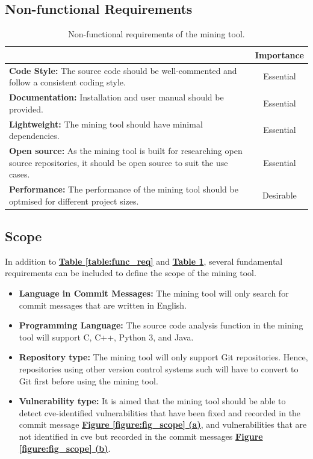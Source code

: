 \documentclass[12pt, a4paper]{report}
\begin{document}
\subsection{Non-functional Requirements}
\begin{table}[H]
  \centering
  \begin{tabular}{|p{10.3cm}|c|}
    \hline \rowcolor[HTML]{D8D8D8}
    \multicolumn{1}{|c|}{Criteria} & Importance \\ \hline
    \textbf{Code Style:} The source code should be well-commented and follow a consistent coding
    style. & Essential  \\ \hline
    \textbf{Documentation:} Installation and user manual should be provided. & Essential \\ \hline
    \textbf{Lightweight:} The mining tool should have minimal dependencies. & Essential \\ \hline
    \textbf{Open source:} As the mining tool is built for researching open source repositories, it
    should be open source to suit the use cases. & Essential \\ \hline
    \textbf{Performance:} The performance of the mining tool should be optmised for different
    project sizes. & Desirable \\ \hline
  \end{tabular}
  \caption{Non-functional requirements of the mining tool.} \label{table:nonfunc_req}
\end{table}

\subsection{Scope}
In addition to \hyperref[table:func_req]{\textbf{Table \ref*{table:func_req}}} and
\hyperref[table:nonfunc_req]{\textbf{Table \ref*{table:nonfunc_req}}}, several fundamental
requirements can be included to define the scope of the mining tool.

\begin{itemize}
  \item \textbf{Language in Commit Messages:} The mining tool will only search for commit messages
  that are written in English.
  \item \textbf{Programming Language:} The source code analysis function in the mining tool will
  support C, C++, Python 3, and Java.
  \item \textbf{Repository type:} The mining tool will only support Git repositories. Hence,
  repositories using other version control systems such will have to convert to Git first before
  using the mining tool.
  \item \textbf{Vulnerability type:} It is aimed that the mining tool should be able to detect
  \acrshort{cve}-identified vulnerabilities that have been fixed and recorded in the commit message
  \hyperref[figure:cve_vuln]{\textbf{Figure \ref*{figure:fig_scope} (a)}}, and vulnerabilities that
  are not identified in \acrshort{cve} but recorded in the commit messages
  \hyperref[figure:common_vuln]{\textbf{Figure \ref*{figure:fig_scope} (b)}}.
\end{itemize}
\end{document}
